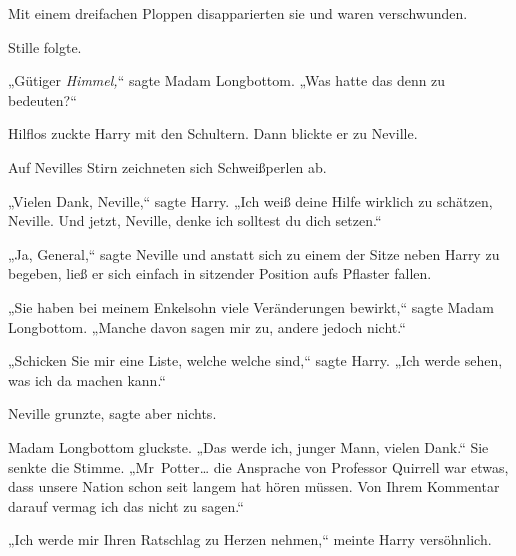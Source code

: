 Mit einem dreifachen Ploppen disapparierten sie und waren verschwunden.

Stille folgte.

„Gütiger \emph{Himmel,}“ sagte Madam Longbottom. „Was hatte das denn zu bedeuten?“

Hilflos zuckte Harry mit den Schultern. Dann blickte er zu Neville.

Auf Nevilles Stirn zeichneten sich Schweißperlen ab.

„Vielen Dank, Neville,“ sagte Harry. „Ich weiß deine Hilfe wirklich zu schätzen, Neville. Und jetzt, Neville, denke ich solltest du dich setzen.“

„Ja, General,“ sagte Neville und anstatt sich zu einem der Sitze neben Harry zu begeben, ließ er sich einfach in sitzender Position aufs Pflaster fallen.

„Sie haben bei meinem Enkelsohn viele Veränderungen bewirkt,“ sagte Madam Longbottom. „Manche davon sagen mir zu, andere jedoch nicht.“

„Schicken Sie mir eine Liste, welche welche sind,“ sagte Harry. „Ich werde sehen, was ich da machen kann.“

Neville grunzte, sagte aber nichts.

Madam Longbottom gluckste. „Das werde ich, junger Mann, vielen Dank.“ Sie senkte die Stimme. „Mr~Potter… die Ansprache von Professor Quirrell war etwas, dass unsere Nation schon seit langem hat hören müssen. Von Ihrem Kommentar darauf vermag ich das nicht zu sagen.“

„Ich werde mir Ihren Ratschlag zu Herzen nehmen,“ meinte Harry versöhnlich.

